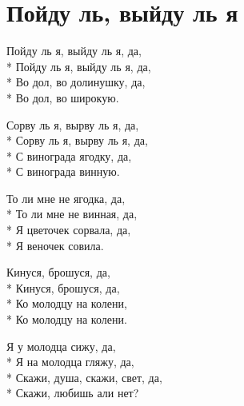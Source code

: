 \vspace{\fill}\newpage

\section{Пойду ль, выйду ль я}
\label{song:Пойду_ль,_выйду_ль_я}

\medskip

\begin{minipage}{\linewidth}
Пойду ль я, выйду ль я, да,\\*
Пойду ль я, выйду ль я, да,\\*
Во дол, во долинушку, да,\\*
Во дол, во широкую.\\
\end{minipage}\par\medskip\nobreak

\medskip

\begin{minipage}{\linewidth}
Сорву ль я, вырву ль я, да,\\*
Сорву ль я, вырву ль я, да,\\*
С винограда ягодку, да,\\*
С винограда винную.\\
\end{minipage}\par\medskip\nobreak

\medskip

\begin{minipage}{\linewidth}
То ли мне не ягодка, да,\\*
То ли мне не винная, да,\\*
Я цветочек сорвала, да,\\*
Я веночек совила.\\
\end{minipage}\par\medskip\nobreak

\medskip

\begin{minipage}{\linewidth}
Кинуся, брошуся, да,\\*
Кинуся, брошуся, да,\\*
Ко молодцу на колени,\\*
Ко молодцу на колени.\\
\end{minipage}\par\medskip\nobreak

\medskip

\begin{minipage}{\linewidth}
Я у молодца сижу, да,\\*
Я на молодца гляжу, да,\\*
Скажи, душа, скажи, свет, да,\\*
Скажи, любишь али нет?\\
\end{minipage}\par\medskip\nobreak

